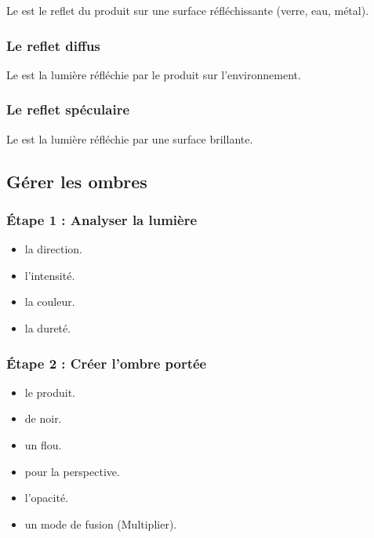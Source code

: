 Le  est le reflet du produit sur une surface réfléchissante (verre, eau, métal).

\subsubsection{Le reflet diffus}

Le  est la lumière réfléchie par le produit sur l'environnement.

\subsubsection{Le reflet spéculaire}

Le  est la lumière réfléchie par une surface brillante.

\subsection{Gérer les ombres}

\subsubsection{Étape 1 : Analyser la lumière}

\begin{itemize}
    \item {} la direction.
    \item {} l'intensité.
    \item {} la couleur.
    \item {} la dureté.
\end{itemize}

\subsubsection{Étape 2 : Créer l'ombre portée}

\begin{itemize}
    \item {} le produit.
    \item {} de noir.
    \item {} un flou.
    \item {} pour la perspective.
    \item {} l'opacité.
    \item {} un mode de fusion (Multiplier).
\end{itemize}

